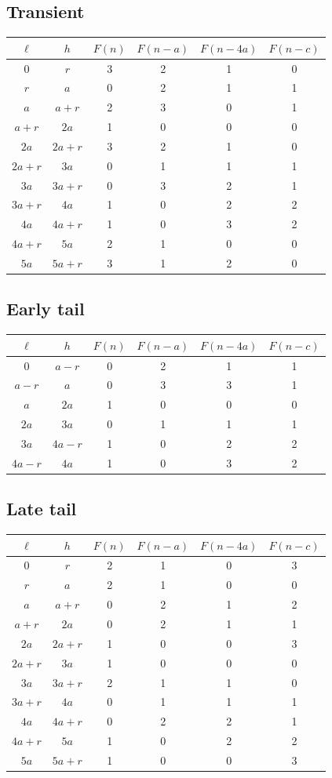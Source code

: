 \subsection*{Transient}
\begin{longtable}{cc|c|ccc}\toprule
$\ell$ & $h$ & $F(n)$ & $F(n-a)$ & $F(n-4a)$ & $F(n-c)$\\ \midrule\endhead
$0$ & $r$ & 3 & 2 & 1 & 0\\
$r$ & $a$ & 0 & 2 & 1 & 1\\
$a$ & $a+r$ & 2 & 3 & 0 & 1\\
$a+r$ & $2a$ & 1 & 0 & 0 & 0\\
$2a$ & $2a+r$ & 3 & 2 & 1 & 0\\
$2a+r$ & $3a$ & 0 & 1 & 1 & 1\\
$3a$ & $3a+r$ & 0 & 3 & 2 & 1\\
$3a+r$ & $4a$ & 1 & 0 & 2 & 2\\
$4a$ & $4a+r$ & 1 & 0 & 3 & 2\\
$4a+r$ & $5a$ & 2 & 1 & 0 & 0\\
$5a$ & $5a+r$ & 3 & 1 & 2 & 0\\
\bottomrule\end{longtable}
\subsection*{Early tail}
\begin{longtable}{cc|c|ccc}\toprule
$\ell$ & $h$ & $F(n)$ & $F(n-a)$ & $F(n-4a)$ & $F(n-c)$\\ \midrule\endhead
$0$ & $a-r$ & 0 & 2 & 1 & 1\\
$a-r$ & $a$ & 0 & 3 & 3 & 1\\
$a$ & $2a$ & 1 & 0 & 0 & 0\\
$2a$ & $3a$ & 0 & 1 & 1 & 1\\
$3a$ & $4a-r$ & 1 & 0 & 2 & 2\\
$4a-r$ & $4a$ & 1 & 0 & 3 & 2\\
\bottomrule\end{longtable}
\subsection*{Late tail}
\begin{longtable}{cc|c|ccc}\toprule
$\ell$ & $h$ & $F(n)$ & $F(n-a)$ & $F(n-4a)$ & $F(n-c)$\\ \midrule\endhead
$0$ & $r$ & 2 & 1 & 0 & 3\\
$r$ & $a$ & 2 & 1 & 0 & 0\\
$a$ & $a+r$ & 0 & 2 & 1 & 2\\
$a+r$ & $2a$ & 0 & 2 & 1 & 1\\
$2a$ & $2a+r$ & 1 & 0 & 0 & 3\\
$2a+r$ & $3a$ & 1 & 0 & 0 & 0\\
$3a$ & $3a+r$ & 2 & 1 & 1 & 0\\
$3a+r$ & $4a$ & 0 & 1 & 1 & 1\\
$4a$ & $4a+r$ & 0 & 2 & 2 & 1\\
$4a+r$ & $5a$ & 1 & 0 & 2 & 2\\
$5a$ & $5a+r$ & 1 & 0 & 0 & 3\\
\bottomrule\end{longtable}